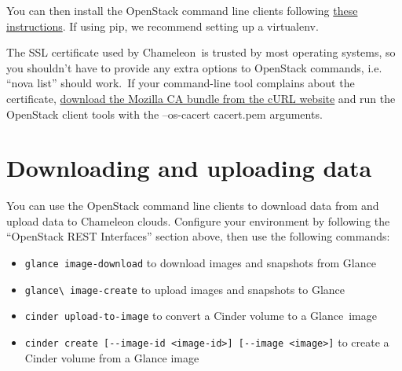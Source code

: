 You can then install the OpenStack command line clients following
\href{http://docs.openstack.org/user-guide/common/cli_install_openstack_command_line_clients.html}{these
instructions}. If using pip, we recommend setting up a virtualenv.

The SSL certificate used by Chameleon~is trusted by most operating
systems, so you shouldn't have to provide any extra options to OpenStack
commands, i.e. ``nova list'' should work.~If your command-line tool
complains about the certificate,
\href{http://curl.haxx.se/docs/caextract.html}{download the Mozilla CA
bundle from the cURL website} and run the OpenStack client tools with
the --os-cacert cacert.pem arguments.

\section{Downloading and uploading data}\label{downloading-and-uploading-data}

You can use the OpenStack command line clients to download data from and
upload data to Chameleon clouds. Configure your environment by following
the ``OpenStack REST Interfaces'' section above, then use the following
commands:

\begin{itemize}
\item
  \verb|glance image-download| to download images and snapshots from
  Glance
\item
  \verb|glance\ image-create| to upload images and snapshots to Glance
\item
  \verb|cinder upload-to-image| to convert a Cinder volume to a
  Glance~image
\item
  \verb|cinder create [--image-id <image-id>] [--image <image>]|
  to create a Cinder volume from a Glance image
\end{itemize}


